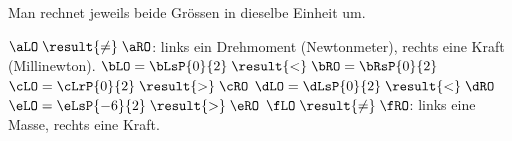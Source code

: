 Man rechnet jeweils beide Grössen in dieselbe Einheit um.
\begin{abcliste}
\abc $\aLO \;\result{\neq}\; \aRO$: links ein Drehmoment (Newtonmeter), rechts eine Kraft (Millinewton).
\abc $\bLO = \bLsP{0}{2} \;\result{<}\; \bRO = \bRsP{0}{2}$
\abc $\cLO = \cLrP{0}{2} \;\result{>}\; \cRO$
\abc $\dLO = \dLsP{0}{2} \;\result{<}\; \dRO$
\abc $\eLO = \eLsP{-6}{2} \;\result{>}\; \eRO$
\abc $\fLO \;\result{\neq}\; \fRO$: links eine Masse, rechts eine Kraft.
\end{abcliste}
